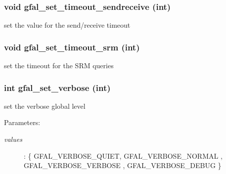 \subsubsection{\setlength{\rightskip}{0pt plus 5cm}void gfal\_\-set\_\-timeout\_\-sendreceive (int)}\label{group__common__group_gedd91bb343f17bc2c0ba9db1203f1819}


set the value for the send/receive timeout 
\subsubsection{\setlength{\rightskip}{0pt plus 5cm}void gfal\_\-set\_\-timeout\_\-srm (int)}\label{group__common__group_gc0dac1437f150d4b5b8779f456050bec}


set the timeout for the SRM queries 
\subsubsection{\setlength{\rightskip}{0pt plus 5cm}int gfal\_\-set\_\-verbose (int)}\label{group__common__group_g331e181c2fadd801321ad43033835052}


set the verbose global level 

\begin{Desc}
\item[Parameters:]
\begin{description}
\item[{\em values}]: \{ GFAL\_\-VERBOSE\_\-QUIET, GFAL\_\-VERBOSE\_\-NORMAL , GFAL\_\-VERBOSE\_\-VERBOSE , GFAL\_\-VERBOSE\_\-DEBUG \} \end{description}
\end{Desc}
